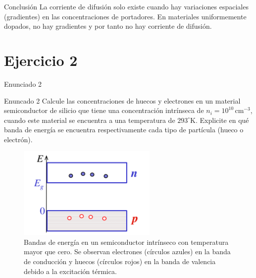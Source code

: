 \documentclass[
    10pt,
    aspectratio=169,
    xcolor={dvipsnames},
    spanish,
    ]{beamer}
\begin{document}
\begin{frame}
  \begin{block}{Conclusión}
    \scriptsize
    La corriente de difusión solo existe cuando hay variaciones espaciales (gradientes) en las concentraciones de portadores. En materiales uniformemente dopados, no hay gradientes y por tanto no hay corriente de difusión.
  \end{block}
\end{frame}
\section{Ejercicio 2}
\begin{frame}{Enunciado 2}
  \begin{block}{Enuncado 2}
Calcule las concentraciones de huecos y electrones en un material semiconductor de silicio que tiene una concentración intrínseca de $n_i = 10^{10}\,\text{cm}^{-3}$, cuando este material se encuentra a una temperatura de $293^\circ \text{K}$. Explicite en qué banda de energía se encuentra respectivamente cada tipo de partícula (hueco o electrón).
  \end{block}
\end{frame}
\begin{frame}
      \begin{figure}[H]
        \centering
        \includegraphics[width=0.6\textwidth]{../figures/Auxiliar_2_6}
        \caption{Bandas de energía en un semiconductor intrínseco con temperatura mayor que cero. Se observan electrones (círculos azules) en la banda de conducción y huecos (círculos rojos) en la banda de valencia debido a la excitación térmica.}
        \label{fig:bandas_temp}
    \end{figure}
\end{frame}
\end{document}

